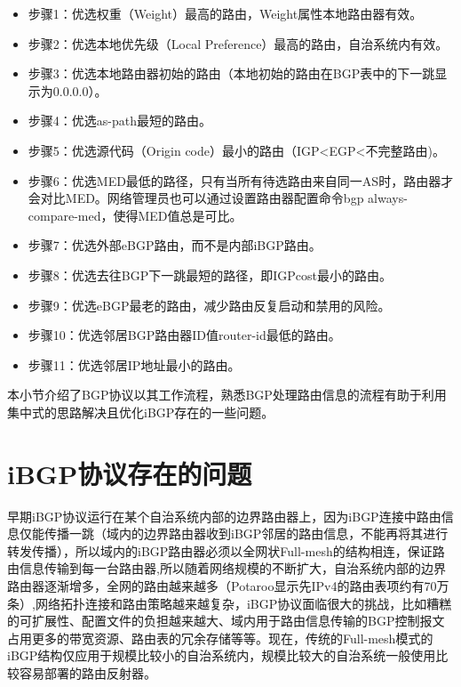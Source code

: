 \begin{itemize}
    \item 步骤1：优选权重（Weight）最高的路由，Weight属性本地路由器有效。
    \item 步骤2：优选本地优先级（Local Preference）最高的路由，自治系统内有效。
    \item 步骤3：优选本地路由器初始的路由（本地初始的路由在BGP表中的下一跳显示为0.0.0.0）。
    \item 步骤4：优选as-path最短的路由。
    \item 步骤5：优选源代码（Origin code）最小的路由（IGP<EGP<不完整路由)。
    \item 步骤6：优选MED最低的路径，只有当所有待选路由来自同一AS时，路由器才会对比MED。网络管理员也可以通过设置路由器配置命令bgp always-compare-med，使得MED值总是可比。
    \item 步骤7：优选外部eBGP路由，而不是内部iBGP路由。
    \item 步骤8：优选去往BGP下一跳最短的路径，即IGPcost最小的路由。
    \item 步骤9：优选eBGP最老的路由，减少路由反复启动和禁用的风险。
    \item 步骤10：优选邻居BGP路由器ID值router-id最低的路由。
    \item 步骤11：优选邻居IP地址最小的路由。
\end{itemize}

本小节介绍了BGP协议以其工作流程，熟悉BGP处理路由信息的流程有助于利用集中式的思路解决且优化iBGP存在的一些问题。

\section{iBGP协议存在的问题}

早期iBGP协议运行在某个自治系统内部的边界路由器上，因为iBGP连接中路由信息仅能传播一跳（域内的边界路由器收到iBGP邻居的路由信息，不能再将其进行转发传播），所以域内的iBGP路由器必须以全网状Full-mesh的结构相连，保证路由信息传输到每一台路由器,所以随着网络规模的不断扩大，自治系统内部的边界路由器逐渐增多，全网的路由越来越多（Potaroo显示先IPv4的路由表项约有70万条\cite{bgptabledata}）,网络拓扑连接和路由策略越来越复杂，iBGP协议面临很大的挑战\cite{ibgp2016infocom}，比如糟糕的可扩展性、配置文件的负担越来越大、域内用于路由信息传输的BGP控制报文占用更多的带宽资源、路由表的冗余存储等等。现在，传统的Full-mesh模式的iBGP结构仅应用于规模比较小的自治系统内，规模比较大的自治系统一般使用比较容易部署的路由反射器。

